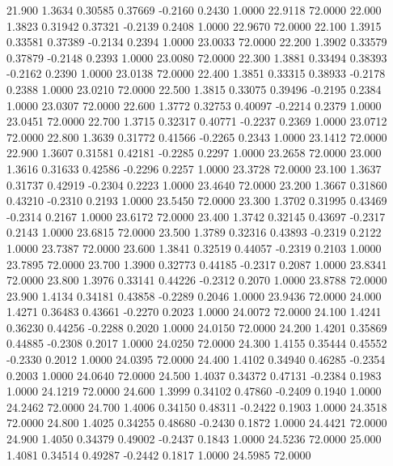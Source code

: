  21.900   1.3634   0.30585   0.37669  -0.2160   0.2430   1.0000  22.9118  72.0000
  22.000   1.3823   0.31942   0.37321  -0.2139   0.2408   1.0000  22.9670  72.0000
  22.100   1.3915   0.33581   0.37389  -0.2134   0.2394   1.0000  23.0033  72.0000
  22.200   1.3902   0.33579   0.37879  -0.2148   0.2393   1.0000  23.0080  72.0000
  22.300   1.3881   0.33494   0.38393  -0.2162   0.2390   1.0000  23.0138  72.0000
  22.400   1.3851   0.33315   0.38933  -0.2178   0.2388   1.0000  23.0210  72.0000
  22.500   1.3815   0.33075   0.39496  -0.2195   0.2384   1.0000  23.0307  72.0000
  22.600   1.3772   0.32753   0.40097  -0.2214   0.2379   1.0000  23.0451  72.0000
  22.700   1.3715   0.32317   0.40771  -0.2237   0.2369   1.0000  23.0712  72.0000
  22.800   1.3639   0.31772   0.41566  -0.2265   0.2343   1.0000  23.1412  72.0000
  22.900   1.3607   0.31581   0.42181  -0.2285   0.2297   1.0000  23.2658  72.0000
  23.000   1.3616   0.31633   0.42586  -0.2296   0.2257   1.0000  23.3728  72.0000
  23.100   1.3637   0.31737   0.42919  -0.2304   0.2223   1.0000  23.4640  72.0000
  23.200   1.3667   0.31860   0.43210  -0.2310   0.2193   1.0000  23.5450  72.0000
  23.300   1.3702   0.31995   0.43469  -0.2314   0.2167   1.0000  23.6172  72.0000
  23.400   1.3742   0.32145   0.43697  -0.2317   0.2143   1.0000  23.6815  72.0000
  23.500   1.3789   0.32316   0.43893  -0.2319   0.2122   1.0000  23.7387  72.0000
  23.600   1.3841   0.32519   0.44057  -0.2319   0.2103   1.0000  23.7895  72.0000
  23.700   1.3900   0.32773   0.44185  -0.2317   0.2087   1.0000  23.8341  72.0000
  23.800   1.3976   0.33141   0.44226  -0.2312   0.2070   1.0000  23.8788  72.0000
  23.900   1.4134   0.34181   0.43858  -0.2289   0.2046   1.0000  23.9436  72.0000
  24.000   1.4271   0.36483   0.43661  -0.2270   0.2023   1.0000  24.0072  72.0000
  24.100   1.4241   0.36230   0.44256  -0.2288   0.2020   1.0000  24.0150  72.0000
  24.200   1.4201   0.35869   0.44885  -0.2308   0.2017   1.0000  24.0250  72.0000
  24.300   1.4155   0.35444   0.45552  -0.2330   0.2012   1.0000  24.0395  72.0000
  24.400   1.4102   0.34940   0.46285  -0.2354   0.2003   1.0000  24.0640  72.0000
  24.500   1.4037   0.34372   0.47131  -0.2384   0.1983   1.0000  24.1219  72.0000
  24.600   1.3999   0.34102   0.47860  -0.2409   0.1940   1.0000  24.2462  72.0000
  24.700   1.4006   0.34150   0.48311  -0.2422   0.1903   1.0000  24.3518  72.0000
  24.800   1.4025   0.34255   0.48680  -0.2430   0.1872   1.0000  24.4421  72.0000
  24.900   1.4050   0.34379   0.49002  -0.2437   0.1843   1.0000  24.5236  72.0000
  25.000   1.4081   0.34514   0.49287  -0.2442   0.1817   1.0000  24.5985  72.0000
